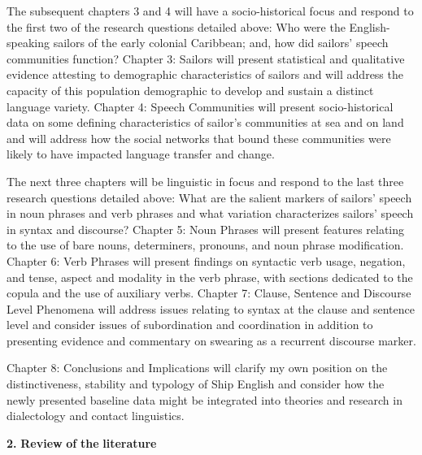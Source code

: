 \begin{styleNormali}
  The subsequent chapters 3 and 4 will have a socio-historical focus and respond to the first two of the research questions detailed above: Who were the English-speaking sailors of the early colonial Caribbean; and, how did sailors’ speech communities function? Chapter 3: Sailors will present statistical and qualitative evidence attesting to demographic characteristics of sailors and will address the capacity of this population demographic to develop and sustain a distinct language variety. Chapter 4: Speech Communities will present socio-historical data on some defining characteristics of sailor’s communities at sea and on land and will address how the social networks that bound these communities were likely to have impacted language transfer and change.  
\end{styleNormali}

\begin{styleNormali}
  The next three chapters will be linguistic in focus and respond to the last three research questions detailed above: What are the salient markers of sailors’ speech in noun phrases and verb phrases and what variation characterizes sailors’ speech in syntax and discourse? Chapter 5: Noun Phrases will present features relating to the use of bare nouns, determiners, pronouns, and noun phrase modification. Chapter 6: Verb Phrases will present findings on syntactic verb usage, negation, and tense, aspect and modality in the verb phrase, with sections dedicated to the copula and the use of auxiliary verbs. Chapter 7: Clause, Sentence and Discourse Level Phenomena will address issues relating to syntax at the clause and sentence level and consider issues of subordination and coordination in addition to presenting evidence and commentary on swearing as a recurrent discourse marker.
\end{styleNormali}

\begin{styleNormali}
  Chapter 8: Conclusions and Implications will clarify my own position on the distinctiveness, stability and typology of Ship English and consider how the newly presented baseline data might be integrated into theories and research in dialectology and contact linguistics.
\end{styleNormali}

\textbf{2.} \textbf{Review} \textbf{of} \textbf{the} \textbf{literature}

